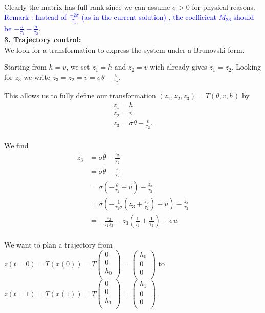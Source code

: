 Clearly the matrix has full rank since we can assume $\sigma>0$ for physical reasons.
\textcolor{blue}{Remark : Instead of $\frac{-2\sigma}{\tau_{1}}$ (as in the current solution) , the coefficient $M_{23}$ should be $-\frac{\sigma}{\tau_{1}}-\frac{\sigma}{\tau_{2}}$}.\\


\textbf{3. Trajectory control:}\\

We look for a transformation to express the system under a Brunovski form. 

Starting from $\dot{h}=v$, we set $z_{1}=h$ and $z_{2}=v$ wich already gives $\dot{z_{1}}=z_{2}$. Looking for $z_{3}$ we write $z_{3}=\dot{z_{2}}=\dot{v}=\sigma\theta-\frac{v}{\tau_{2}}$.

This allows us to fully define our transformation $(z_{1},z_{2},z_{3})=T(\theta,v,h)$ by
$$\begin{array}{lll}
z_{1}=h\\
z_{2}=v\\
z_{3}=\sigma\theta-\frac{v}{\tau_{2}}.\\
\end{array}$$

We find 
\begin{align*}
\dot{z_{3}}&=\sigma\dot{\theta}-\frac{\dot{v}}{\tau_{2}}\\
&=\sigma\dot{\theta}-\frac{z_{3}}{\tau_{2}}\\
&=\sigma(-\frac{\theta }{\tau_{1}}+u)-\frac{z_{3}}{\tau_{2}}\\
&=\sigma(-\frac{1}{\tau_{1}\sigma}(z_{3}+\frac{z_{2}}{\tau_{2}})+u)-\frac{z_{3}}{\tau_{2}}\\
&=-\frac{z_{2}}{\tau_{1}\tau_{2}}-z_{3}(\frac{1}{\tau_{1}}+\frac{1}{\tau_{2}})+\sigma u\\
\end{align*}

We want to plan a trajectory from $z(t=0)=T(x(0))=T\begin{pmatrix}
0\\
0\\
h_{0}\\
\end{pmatrix}=\begin{pmatrix}
h_{0}\\
0\\
0\\
\end{pmatrix}$ to $z(t=1)=T(x(1))=T\begin{pmatrix}
0\\
0\\
h_{1}\\
\end{pmatrix}=\begin{pmatrix}
h_{1}\\
0\\
0\\
\end{pmatrix}.$

